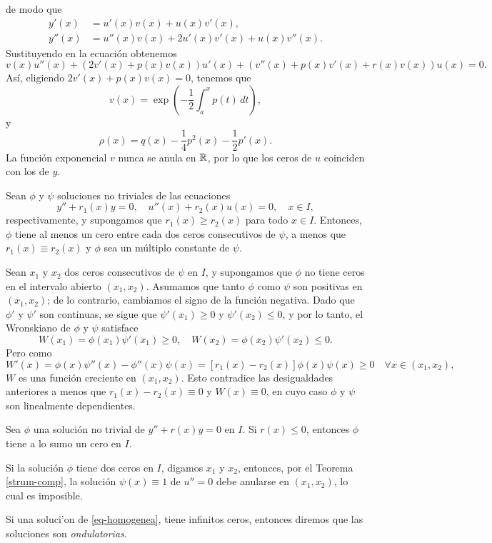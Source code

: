 \documentclass[main.tex]{subfiles}
\begin{document}
de modo que
\begin{align*}
y'(x) &= u'(x) v(x) + u(x) v'(x),\\
y''(x) &= u''(x) v(x) + 2 u'(x) v'(x) + u(x) v''(x).
\end{align*}
Sustituyendo en la ecuación obtenemos
\[
v(x)u''(x)+ (2v'(x)+p(x)v(x))u'(x) + (v''(x)+p(x)v'(x)+r(x)v(x))u(x)=0.
\]
Así, eligiendo \(2v'(x)+p(x)v(x)=0\), tenemos que
\[
v(x)=\exp\left(-\frac{1}{2}\int_a^xp(t)\,dt\right),
\]
y
\[
\rho(x)=q(x)-\frac{1}{4}p^2(x)-\frac{1}{2}p'(x).
\]
La función exponencial \(v\) nunca se anula en \(\mathbb R \), por lo que los ceros de \(u\) coinciden con los de \(y\).
\begin{teorema}\label{strum-comp}
Sean \(\phi\) y \(\psi\) soluciones no triviales de las ecuaciones
\[
y''+r_1(x)y=0,\quad u''(x)+r_2(x)u(x)=0,\quad x\in I,
\]
respectivamente, y supongamos que \(r_1(x)\geq r_2(x)\) para todo \(x\in I\). Entonces, \(\phi\) tiene al menos un cero entre cada dos ceros consecutivos de \(\psi\), a menos que \(r_1(x)\equiv r_2(x)\) y \(\phi\) sea un múltiplo constante de \(\psi\).
\end{teorema}
\dem Sean \(x_1\) y \(x_2\) dos ceros consecutivos de \(\psi\) en \(I\), y supongamos que \(\phi\) no tiene ceros en el intervalo abierto \((x_1,x_2)\). Asumamos que tanto \(\phi\) como \(\psi\) son positivas en \((x_1, x_2)\); de lo contrario, cambiamos el signo de la función negativa. Dado que \(\phi'\) y \(\psi'\) son continuas, se sigue que \(\psi'(x_1)\geq0\) y \(\psi'(x_2)\leq0\), y por lo tanto, el Wronskiano de \(\phi\) y \(\psi\) satisface
\[
W(x_1)=\phi(x_1)\psi'(x_1)\geq0,\quad W(x_2)=\phi(x_2)\psi'(x_2)\leq 0.
\]
Pero como
\[
W'(x)=\phi(x)\psi''(x)-\phi''(x)\psi(x)=[r_1(x)-r_2(x)]\phi(x)\psi(x)\geq0\quad\forall x\in(x_1,x_2),
\]
\(W\) es una función creciente en \((x_1,x_2)\). Esto contradice las desigualdades anteriores a menos que \(r_1(x)-r_2(x)\equiv0\) y \(W(x)\equiv0\), en cuyo caso \(\phi\) y \(\psi\) son linealmente dependientes.
\QED\\
\begin{cor}
Sea \(\phi\) una solución no trivial de \(y''+r(x)y=0\) en \(I\). Si \(r(x)\leq0\), entonces \(\phi\) tiene a lo sumo un cero en \(I\).
\end{cor}
\dem Si la solución \(\phi\) tiene dos ceros en \(I\), digamos \(x_1\) y \(x_2\), entonces, por el Teorema \ref{strum-comp}, la solución \(\psi(x)\equiv1\) de \(u''= 0\) debe anularse en \((x_1,x_2)\), lo cual es imposible.
\begin{def.}
  Si una soluci'on de \ref{eq-homogenea}, tiene infinitos ceros, entonces diremos que las soluciones son \emph{ondulatorias}.
\end{def.}
\end{document}
